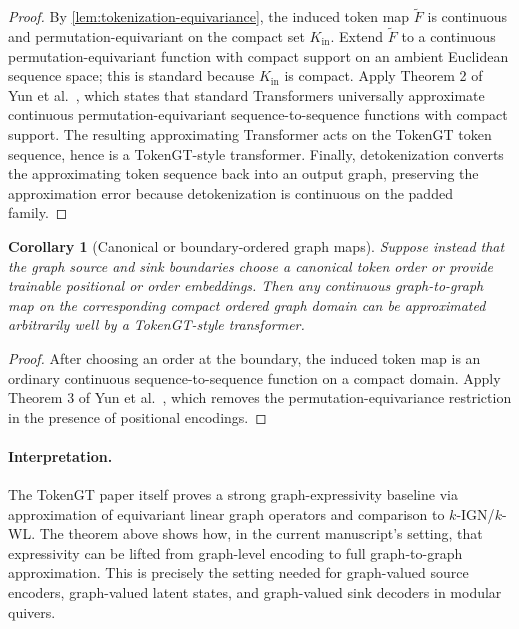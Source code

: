 \documentclass[11pt]{article}
\theoremstyle{definition}
\theoremstyle{plain}
\newtheorem{corollary}{Corollary}[section]
\theoremstyle{remark}
\begin{document}
\begin{proof}
By \cref{lem:tokenization-equivariance}, the induced token map $\widetilde F$ is continuous and permutation-equivariant on the compact set $K_{\mathrm{in}}$.
Extend $\widetilde F$ to a continuous permutation-equivariant function with compact support on an ambient Euclidean sequence space; this is standard because $K_{\mathrm{in}}$ is compact.
Apply Theorem 2 of Yun et al.\ \cite{YunBhojanapalliRawatKumarReddi2020}, which states that standard Transformers universally approximate continuous permutation-equivariant sequence-to-sequence functions with compact support.
The resulting approximating Transformer acts on the TokenGT token sequence, hence is a TokenGT-style transformer.
Finally, detokenization converts the approximating token sequence back into an output graph, preserving the approximation error because detokenization is continuous on the padded family.
\end{proof}

\begin{corollary}[Canonical or boundary-ordered graph maps]
\label{cor:tokengt-graph-uap-general}
Suppose instead that the graph source and sink boundaries choose a canonical token order or provide trainable positional or order embeddings.
Then any continuous graph-to-graph map on the corresponding compact ordered graph domain can be approximated arbitrarily well by a TokenGT-style transformer.
\end{corollary}

\begin{proof}
After choosing an order at the boundary, the induced token map is an ordinary continuous sequence-to-sequence function on a compact domain.
Apply Theorem 3 of Yun et al.\ \cite{YunBhojanapalliRawatKumarReddi2020}, which removes the permutation-equivariance restriction in the presence of positional encodings.
\end{proof}

\paragraph{Interpretation.}
The TokenGT paper itself proves a strong graph-expressivity baseline via approximation of equivariant linear graph operators and comparison to $k$-IGN/$k$-WL.
The theorem above shows how, in the current manuscript's setting, that expressivity can be lifted from graph-level encoding to full graph-to-graph approximation.
This is precisely the setting needed for graph-valued source encoders, graph-valued latent states, and graph-valued sink decoders in modular quivers.
\end{document}
